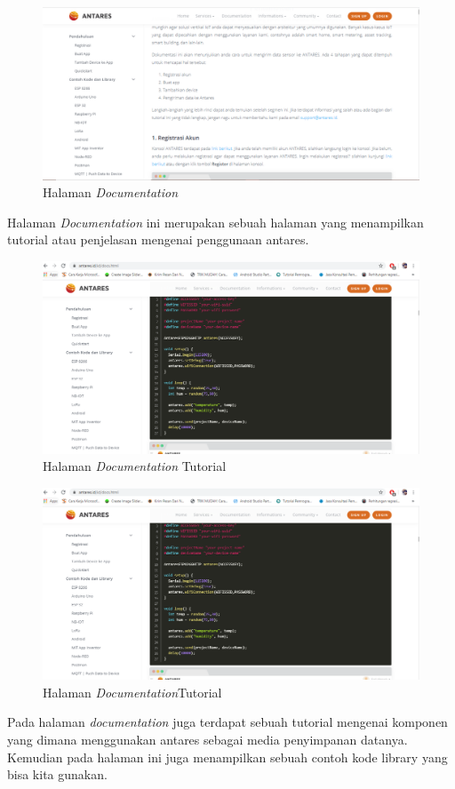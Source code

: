 \begin{enumerate}
    \begin{figure}[H]
    \centering
    \includegraphics[width=1\textwidth]{figures/antares10.png}
    \caption{Halaman \textit{Documentation}}
    \label{print}
    \end{figure}
    \par Halaman \textit{Documentation} ini merupakan sebuah halaman yang menampilkan tutorial atau penjelasan mengenai penggunaan antares.
    \begin{figure}[H]
    \centering
    \includegraphics[width=1\textwidth]{figures/antares11.png}
    \caption{Halaman \textit{Documentation} Tutorial}
    \label{print}
    \end{figure}
    
       \begin{figure}[H]
    \centering
    \includegraphics[width=1\textwidth]{figures/antares11.png}
    \caption{Halaman \textit{Documentation}Tutorial}
    \label{print}
    \end{figure}
    \par Pada halaman \textit{documentation} juga terdapat sebuah tutorial mengenai komponen yang dimana menggunakan antares sebagai media penyimpanan datanya. Kemudian pada halaman ini juga menampilkan sebuah contoh kode library yang bisa kita gunakan.
\end{enumerate} 
